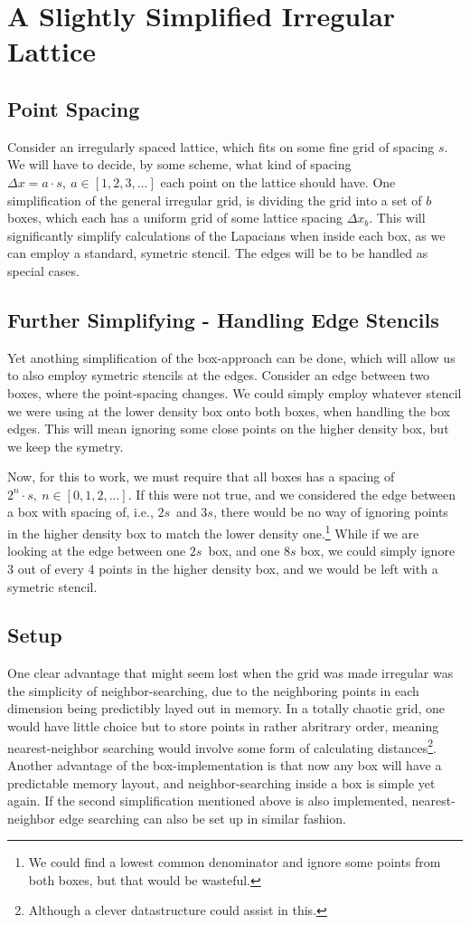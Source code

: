 \documentclass[12p,a4paper]{article}
\begin{document}
\newpage
\section{A Slightly Simplified Irregular Lattice}
\subsection{Point Spacing}
Consider an irregularly spaced lattice, which fits on some fine grid of spacing $s$. We will have to decide, by some scheme, what kind of spacing $\Delta x = a\cdot s,\ a\in [1,2,3,...]$ each point on the lattice should have. One simplification of the general irregular grid, is dividing the grid into a set of $b$ boxes, which each has a uniform grid of some lattice spacing $\Delta x_b$. This will significantly simplify calculations of the Lapacians when inside each box, as we can employ a standard, symetric stencil. The edges will be to be handled as special cases.

\subsection{Further Simplifying - Handling Edge Stencils}
Yet anothing simplification of the box-approach can be done, which will allow us to also employ symetric stencils at the edges. Consider an edge between two boxes, where the point-spacing changes. We could simply employ whatever stencil we were using at the lower density box onto both boxes, when handling the box edges. This will mean ignoring some close points on the higher density box, but we keep the symetry.

Now, for this to work, we must require that all boxes has a spacing of $2^n\cdot s,\ n\in [0,1,2,...]$. If this were not true, and we considered the edge between a box with spacing of, i.e., $2s$ and $3s$, there would be no way of ignoring points in the higher density box to match the lower density one.\footnote{We could find a lowest common denominator and ignore some points from both boxes, but that would be wasteful.} While if we are looking at the edge between one $2s$ box, and one $8s$ box, we could simply ignore 3 out of every 4 points in the higher density box, and we would be left with a symetric stencil.


\subsection{Setup}
One clear advantage that might seem lost when the grid was made irregular was the simplicity of neighbor-searching, due to the neighboring points in each dimension being predictibly layed out in memory. In a totally chaotic grid, one would have little choice but to store points in rather abritrary order, meaning nearest-neighbor searching would involve some form of calculating distances\footnote{Although a clever datastructure could assist in this.}. Another advantage of the box-implementation is that now any box will have a predictable memory layout, and neighbor-searching inside a box is simple yet again. If the second simplification mentioned above is also implemented, nearest-neighbor edge searching can also be set up in similar fashion.
\end{document}
